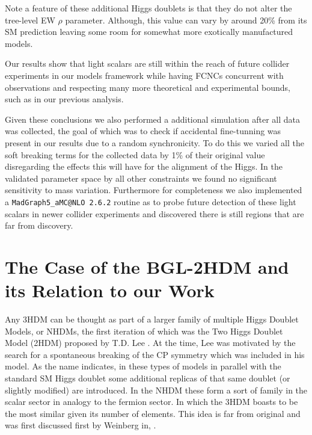 Note a feature of these additional Higgs doublets is that they do not alter the tree-level EW $\rho$ parameter. 
%
Although, this value can vary by around 20\% from its SM prediction leaving some room for somewhat more exotically manufactured models.  %


Our results show that light scalars are still within the reach of future collider experiments in our models framework while having FCNCs concurrent with observations and respecting many more theoretical and experimental bounds, such as in our previous analysis.

Given these conclusions we also performed a additional simulation after all data was collected, the goal of which was to check if accidental fine-tunning was present in our results due to a random synchronicity.
%
To do this we varied all the soft breaking terms for the collected data by 1\% of their original value disregarding the effects this will have for the alignment of the Higgs. 
%
In the validated parameter space by all other constraints we found no significant sensitivity to mass variation.  
%
Furthermore for completeness we also implemented a \texttt{MadGraph5\_aMC@NLO 2.6.2} routine as to probe future detection of these light scalars in newer collider experiments and discovered there is still regions that are far from discovery.  

\section{The Case of the BGL-2HDM and its Relation to our Work}


Any 3HDM can be thought as part of a larger family of multiple Higgs Doublet Models, or NHDMs, the first iteration of which was the Two Higgs Doublet Model (2HDM) proposed by T.D. Lee \cite{Lee1973}.   
%
At the time, Lee was motivated by the search for a spontaneous breaking of the CP symmetry which was included in his model.  
%
As the name indicates, in these types of models in parallel with the standard SM Higgs doublet some additional replicas of that same doublet (or slightly modified) are introduced. 
%
In the NHDM these form a sort of family in the scalar sector in analogy to the fermion sector.
%
In which the 3HDM boasts to be the most similar given its number of elements.
%
This idea is far from original and was first discussed first by Weinberg in, \cite{Weinberg1976}.

